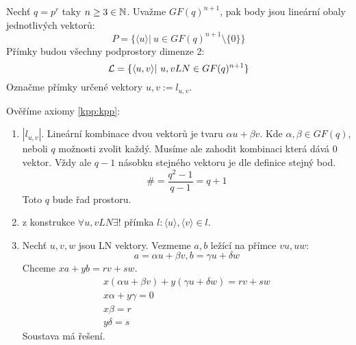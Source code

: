 \begin{example}
	Nechť $q = p^r$ taky $n \geq 3 \in \operatorname{\mathbb{N}}$.
	Uvažme $GF(q)^{n + 1}$, pak body jsou lineární obaly jednotlivých vektorů:
	\[ P = \{ \langle u \rangle |\ u \in GF(q)^{n + 1} \setminus \{ 0 \} \} \]
	Přímky budou všechny podprostory dimenze 2:
	\[ \operatorname{\mathcal{L}} = \{ \langle u, v \rangle |\ u,v LN \in GF(q)^{n + 1} \} \]
	Označme přímky určené vektory $u, v := l_{u, v}$.

	Ověříme axiomy \cref{kpp:kpp}:
	\begin{enumerate}
		\item $|l_{u, v}|$.
			Lineární kombinace dvou vektorů je tvaru $\alpha u + \beta v$.
			Kde $\alpha, \beta \in GF(q)$, neboli $q$ možnosti zvolit každý.
			Musíme ale zahodit kombinaci která dává 0 vektor.
			Vždy ale $q - 1$ násobku stejného vektoru je dle definice stejný bod.
			\[ \# = \frac{q^2 - 1}{q - 1} = q + 1 \]
			Toto $q$ bude řad prostoru.
		\item z konstrukce $\forall u, v LN \exists!$ přímka $l: \langle u \rangle, \langle v \rangle \in l$.
		\item Nechť $u, v, w$ jsou LN vektory.
			Vezmeme $a, b$ ležící na přímce $vu, uw$:
			\[ a = \alpha u + \beta v, b = \gamma u + \delta w \]
			Chceme $xa + yb = rv + sw$.
			\begin{gather*}
				x(\alpha u + \beta v) + y(\gamma u + \delta w) = rv + sw \\
				x \alpha + y \gamma = 0 \\
				x \beta = r \\
				y \delta = s
			\end{gather*}
			Soustava má řešení.
	\end{enumerate}
\end{example}

